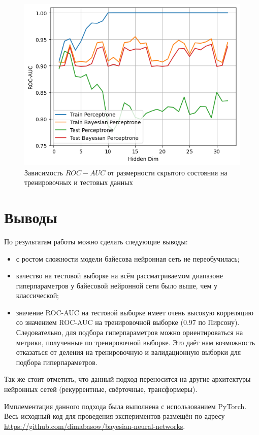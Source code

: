 \documentclass{article}
\begin{document}
\begin{figure}
    \centering
    \includegraphics[width=1\linewidth]{roc_auc.png}
    \caption{Зависимость $ROC-AUC$ от размерности скрытого состояния на тренировочных и тестовых данных}
    \label{fig:enter-label}
\end{figure}

\section{Выводы}
По результатам работы можно сделать следующие выводы:
\begin{itemize}
    \item с ростом сложности модели байесова нейронная сеть не переобучилась;
    \item качество на тестовой выборке на всём рассматриваемом диапазоне гиперпараметров у байесовой нейронной сети было выше, чем у классической;
    \item значение ROC-AUC на тестовой выборке имеет очень высокую корреляцию со значением ROC-AUC на тренировочной выборке (0.97 по Пирсону). Следовательно, для подбора гиперпараметров можно ориентироваться на метрики, полученные по тренировочной выборке. Это даёт нам возможность отказаться от деления на тренировочную и валидационную выборки для подбора гиперпараметров.
\end{itemize}

Так же стоит отметить, что данный подход переносится на другие архитектуры нейронных сетей (рекуррентные, свёрточные, трансформеры).

Имплементация данного подхода была выполнена с использованием PyTorch. Весь исходный код для проведения экспериментов размещён по адресу \url{https://github.com/dimabasow/bayesian-neural-networks}.
\end{document}
